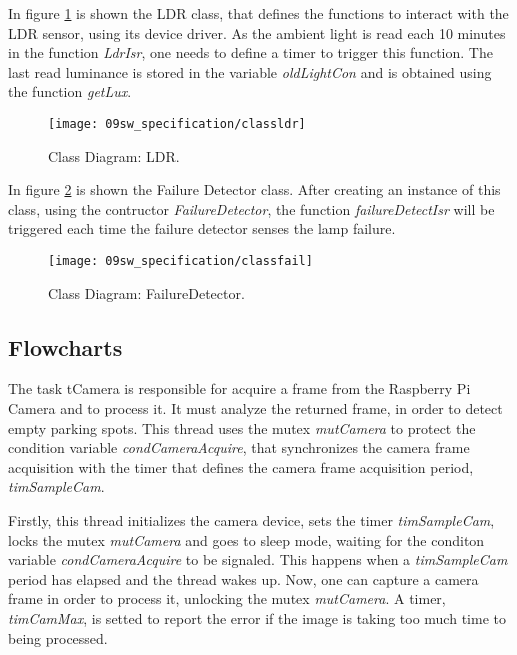 
In figure \ref{fig:classldr} is shown the LDR class, that defines the functions to interact with the LDR sensor, using its device driver. As the ambient light is read each 10 minutes in the function \textit{LdrIsr}, one needs to define a timer to trigger this function. The last read luminance is stored in the variable \textit{oldLightCon} and is obtained using the function \textit{getLux}.

\begin{figure}[H]
	\centering
	\texttt{[image: 09sw\_specification/classldr]}
	\caption{Class Diagram: LDR.}
	\label{fig:classldr}
\end{figure}


In figure \ref{fig:classfail} is shown the Failure Detector class. After creating an instance of this class, using the contructor \textit{FailureDetector}, the function \textit{failureDetectIsr} will be triggered each time the failure detector senses the lamp failure. 

\begin{figure}[H]
	\centering
	\texttt{[image: 09sw\_specification/classfail]}
	\caption{Class Diagram: FailureDetector.}
	\label{fig:classfail}
\end{figure}

\subsection{Flowcharts}
{}

The task tCamera is responsible for acquire a frame from the Raspberry Pi Camera and to process it. It must analyze the returned frame, in order to detect empty parking spots. This thread uses the mutex \textit{mutCamera} to protect the condition variable \textit{condCameraAcquire}, that synchronizes the camera frame acquisition with the timer that defines the camera frame acquisition period, \textit{timSampleCam}.

Firstly, this thread initializes the camera device, sets the timer \textit{timSampleCam}, locks the mutex \textit{mutCamera} and goes to sleep mode, waiting for the conditon variable \textit{condCameraAcquire} to be signaled. This happens when a \textit{timSampleCam} period has elapsed and the thread wakes up. Now, one can capture a camera frame in order to process it, unlocking the mutex \textit{mutCamera}. A timer, \textit{timCamMax}, is setted to report the error if the image is taking too much time to being processed.

